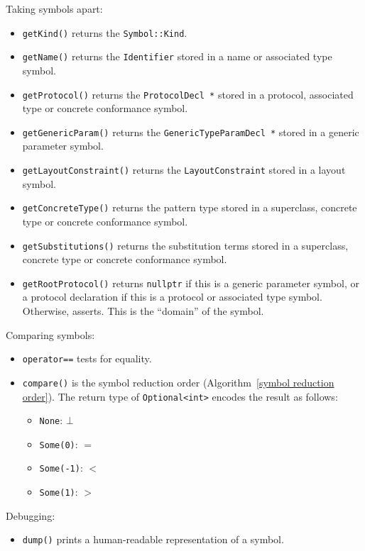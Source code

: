 \documentclass[../generics]{subfiles}
\begin{document}
Taking symbols apart:
\begin{itemize}
\item \texttt{getKind()} returns the \texttt{Symbol::Kind}.
\item \texttt{getName()} returns the \texttt{Identifier} stored in a name or associated type symbol.
\item \texttt{getProtocol()} returns the \texttt{ProtocolDecl *} stored in a protocol, associated type or concrete conformance symbol.
\item \texttt{getGenericParam()} returns the \texttt{GenericTypeParamDecl *} stored in a generic parameter symbol.
\item \texttt{getLayoutConstraint()} returns the \texttt{LayoutConstraint} stored in a layout symbol.
\item \texttt{getConcreteType()} returns the pattern type stored in a superclass, concrete type or concrete conformance symbol.
\item \texttt{getSubstitutions()} returns the substitution terms stored in a superclass, concrete type or concrete conformance symbol.
\item \texttt{getRootProtocol()} returns \texttt{nullptr} if this is a generic parameter symbol, or a protocol declaration if this is a protocol or associated type symbol. Otherwise, asserts. This is the ``domain'' of the symbol.
\end{itemize}
Comparing symbols:
\begin{itemize}
\item \texttt{operator==} tests for equality.
\item \texttt{compare()} is the symbol reduction order (Algorithm~\ref{symbol reduction order}). The return type of \texttt{Optional<int>} encodes the result as follows:
\begin{itemize}
\item \verb|None|: $\bot$
\item \verb|Some(0)|: $=$
\item \verb|Some(-1)|: $<$
\item \verb|Some(1)|: $>$
\end{itemize}
\end{itemize}
Debugging:
\begin{itemize}
\item \texttt{dump()} prints a human-readable representation of a symbol.
\end{itemize}
\end{document}
